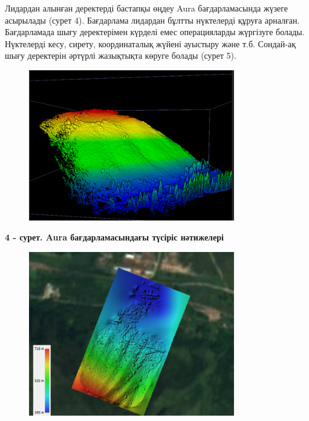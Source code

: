 Лидардан алынған деректерді бастапқы өңдеу Aura бағдарламасында жүзеге
асырылады (сурет 4). Бағдарлама лидардан бұлтты нүктелерді құруға
арналған. Бағдарламада шығу деректерімен күрделі емес операцияларды
жүргізуге болады. Нүктелерді кесу, сирету, координаталық жүйені ауыстыру
және т.б. Сондай-ақ шығу деректерін әртүрлі жазықтықта көруге болады
(сурет 5).


\begin{figure}[H]
	\centering
	\includegraphics[width=0.8\textwidth]{media/ict2/image202}
	\caption*{}
\end{figure}


{\bfseries 4 - сурет. Aura бағдарламасындағы түсіріс нәтижелері}

\begin{figure}[H]
	\centering
	\includegraphics[width=0.8\textwidth]{media/ict2/image203}
	\caption*{}
\end{figure}

